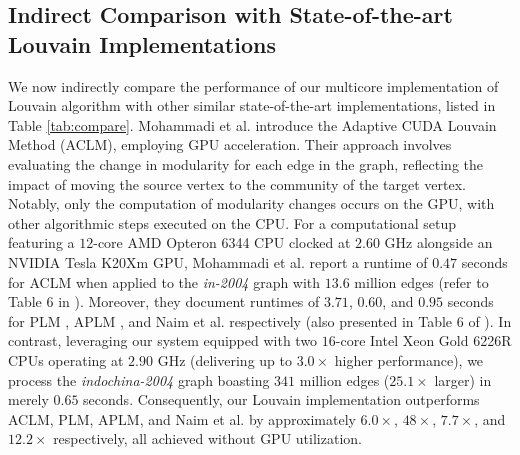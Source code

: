 \subsection{Indirect Comparison with State-of-the-art Louvain Implementations}
\label{sec:comparison-indirect}

We now indirectly compare the performance of our multicore implementation of Louvain algorithm with other similar state-of-the-art implementations, listed in Table \ref{tab:compare}. Mohammadi et al. \cite{com-mohammadi20} introduce the Adaptive CUDA Louvain Method (ACLM), employing GPU acceleration. Their approach involves evaluating the change in modularity for each edge in the graph, reflecting the impact of moving the source vertex to the community of the target vertex. Notably, only the computation of modularity changes occurs on the GPU, with other algorithmic steps executed on the CPU. For a computational setup featuring a $12$-core AMD Opteron 6344 CPU clocked at $2.60$ GHz alongside an NVIDIA Tesla K20Xm GPU, Mohammadi et al. report a runtime of $0.47$ seconds for ACLM when applied to the \textit{in-2004} graph with $13.6$ million edges (refer to Table 6 in \cite{com-mohammadi20}). Moreover, they document runtimes of $3.71$, $0.60$, and $0.95$ seconds for PLM \cite{staudt2015engineering}, APLM \cite{com-fazlali17}, and Naim et al. \cite{com-naim17} respectively (also presented in Table 6 of \cite{com-mohammadi20}). In contrast, leveraging our system equipped with two $16$-core Intel Xeon Gold 6226R CPUs operating at $2.90$ GHz (delivering up to $3.0\times$ higher performance), we process the \textit{indochina-2004} graph boasting $341$ million edges ($25.1\times$ larger) in merely $0.65$ seconds. Consequently, our Louvain implementation outperforms ACLM, PLM, APLM, and Naim et al. by approximately $6.0\times$, $48\times$, $7.7\times$, and $12.2\times$ respectively, all achieved without GPU utilization.
